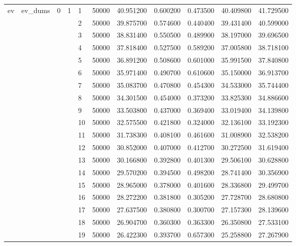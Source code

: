 \begin{tabular}{llllllrrrrr}
\multirow[t]{202}{*}{ev} & \multirow[t]{202}{*}{ev_dums} & \multirow[t]{100}{*}{0} & \multirow[t]{25}{*}{1} & 1 & 50000 & 40.951200 & 0.600200 & 0.473500 & 40.409800 & 41.729500 \\
\cline{5-11}
 &  &  &  & 2 & 50000 & 39.875700 & 0.574600 & 0.440400 & 39.431400 & 40.599000 \\
\cline{5-11}
 &  &  &  & 3 & 50000 & 38.831400 & 0.550500 & 0.489900 & 38.197000 & 39.696500 \\
\cline{5-11}
 &  &  &  & 4 & 50000 & 37.818400 & 0.527500 & 0.589200 & 37.005800 & 38.718100 \\
\cline{5-11}
 &  &  &  & 5 & 50000 & 36.891200 & 0.508600 & 0.601000 & 35.991500 & 37.840800 \\
\cline{5-11}
 &  &  &  & 6 & 50000 & 35.971400 & 0.490700 & 0.610600 & 35.150000 & 36.913700 \\
\cline{5-11}
 &  &  &  & 7 & 50000 & 35.083700 & 0.470800 & 0.454300 & 34.533000 & 35.744400 \\
\cline{5-11}
 &  &  &  & 8 & 50000 & 34.301500 & 0.454000 & 0.373200 & 33.825300 & 34.886600 \\
\cline{5-11}
 &  &  &  & 9 & 50000 & 33.503800 & 0.437000 & 0.369400 & 33.019400 & 34.139800 \\
\cline{5-11}
 &  &  &  & 10 & 50000 & 32.575500 & 0.421800 & 0.324000 & 32.136100 & 33.192300 \\
\cline{5-11}
 &  &  &  & 11 & 50000 & 31.738300 & 0.408100 & 0.461600 & 31.008900 & 32.538200 \\
\cline{5-11}
 &  &  &  & 12 & 50000 & 30.852000 & 0.407000 & 0.412700 & 30.272500 & 31.619400 \\
\cline{5-11}
 &  &  &  & 13 & 50000 & 30.166800 & 0.392800 & 0.401300 & 29.506100 & 30.628800 \\
\cline{5-11}
 &  &  &  & 14 & 50000 & 29.570200 & 0.394500 & 0.498200 & 28.741400 & 30.356900 \\
\cline{5-11}
 &  &  &  & 15 & 50000 & 28.965000 & 0.378000 & 0.401600 & 28.336800 & 29.499700 \\
\cline{5-11}
 &  &  &  & 16 & 50000 & 28.272200 & 0.381800 & 0.305200 & 27.728700 & 28.680800 \\
\cline{5-11}
 &  &  &  & 17 & 50000 & 27.637500 & 0.380800 & 0.300700 & 27.157300 & 28.139600 \\
\cline{5-11}
 &  &  &  & 18 & 50000 & 26.904700 & 0.360300 & 0.363300 & 26.350800 & 27.533100 \\
\cline{5-11}
 &  &  &  & 19 & 50000 & 26.422300 & 0.393700 & 0.657300 & 25.258800 & 27.267900 \\

\end{tabular}
